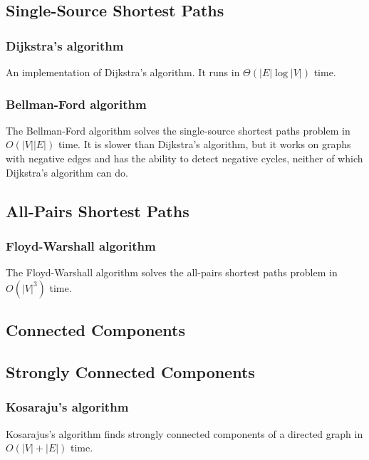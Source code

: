 \documentclass[10pt,a4paper,titlepage]{article}
\begin{document}
\subsection{Single-Source Shortest Paths}
\subsubsection{Dijkstra's algorithm}
An implementation of Dijkstra's algorithm. It runs in $\Theta(|E|\log{|V|})$ time.


\subsubsection{Bellman-Ford algorithm}
The Bellman-Ford algorithm solves the single-source shortest paths problem in $O(|V||E|)$ time. It is slower than Dijkstra's algorithm, but it works on graphs with negative edges and has the ability to detect negative cycles, neither of which Dijkstra's algorithm can do.

\subsection{All-Pairs Shortest Paths}
\subsubsection{Floyd-Warshall algorithm}
The Floyd-Warshall algorithm solves the all-pairs shortest paths problem in $O(|V|^3)$ time.

\subsection{Connected Components}
\subsection{Strongly Connected Components}
\subsubsection{Kosaraju's algorithm}
Kosarajus's algorithm finds strongly connected components of a directed graph in $O(|V|+|E|)$ time.

\end{document}

